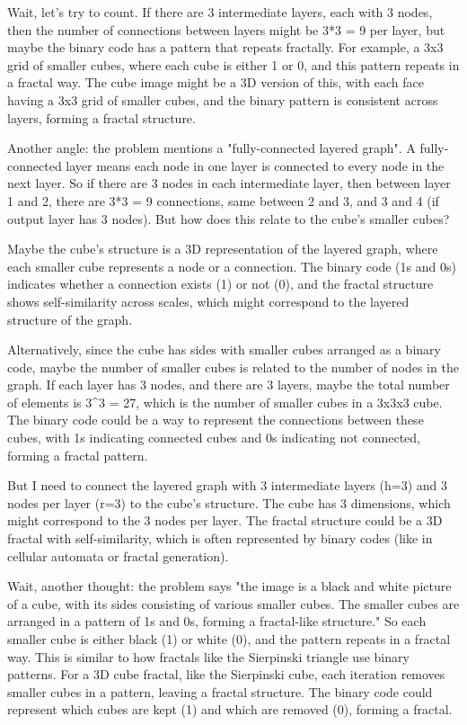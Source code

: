 Wait, let's try to count. If there are 3 intermediate layers, each with 3 nodes, then the number of connections between layers might be 3*3 = 9 per layer, but maybe the binary code has a pattern that repeats fractally. For example, a 3x3 grid of smaller cubes, where each cube is either 1 or 0, and this pattern repeats in a fractal way. The cube image might be a 3D version of this, with each face having a 3x3 grid of smaller cubes, and the binary pattern is consistent across layers, forming a fractal structure.

Another angle: the problem mentions a "fully-connected layered graph". A fully-connected layer means each node in one layer is connected to every node in the next layer. So if there are 3 nodes in each intermediate layer, then between layer 1 and 2, there are 3*3 = 9 connections, same between 2 and 3, and 3 and 4 (if output layer has 3 nodes). But how does this relate to the cube's smaller cubes?

Maybe the cube's structure is a 3D representation of the layered graph, where each smaller cube represents a node or a connection. The binary code (1s and 0s) indicates whether a connection exists (1) or not (0), and the fractal structure shows self-similarity across scales, which might correspond to the layered structure of the graph.

Alternatively, since the cube has sides with smaller cubes arranged as a binary code, maybe the number of smaller cubes is related to the number of nodes in the graph. If each layer has 3 nodes, and there are 3 layers, maybe the total number of elements is 3^3 = 27, which is the number of smaller cubes in a 3x3x3 cube. The binary code could be a way to represent the connections between these cubes, with 1s indicating connected cubes and 0s indicating not connected, forming a fractal pattern.

But I need to connect the layered graph with 3 intermediate layers (h=3) and 3 nodes per layer (r=3) to the cube's structure. The cube has 3 dimensions, which might correspond to the 3 nodes per layer. The fractal structure could be a 3D fractal with self-similarity, which is often represented by binary codes (like in cellular automata or fractal generation).

Wait, another thought: the problem says "the image is a black and white picture of a cube, with its sides consisting of various smaller cubes. The smaller cubes are arranged in a pattern of 1s and 0s, forming a fractal-like structure." So each smaller cube is either black (1) or white (0), and the pattern repeats in a fractal way. This is similar to how fractals like the Sierpinski triangle use binary patterns. For a 3D cube fractal, like the Sierpinski cube, each iteration removes smaller cubes in a pattern, leaving a fractal structure. The binary code could represent which cubes are kept (1) and which are removed (0), forming a fractal.

